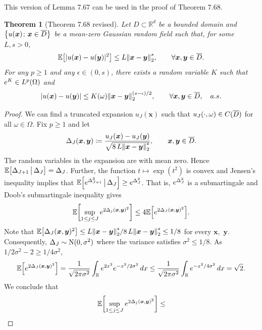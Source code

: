 \documentclass[final]{article}
\newtheorem*{theorem*}{Theorem}
\theoremstyle{definition}
\newcommand{\vecbs}[1]{\boldsymbol{#1}}
\renewcommand{\vec}[1]{{\vecbs{#1}}}
\begin{document}
\begin{enumerate}
\begin{description}
This version of Lemma 7.67 can be used in the proof of Theorem 7.68.


\begin{theorem*}[Theorem 7.68 revised]%
  \label{thm:gauss_reg}%
  Let $D\subset\mathbb{R}^d$ be a bounded  domain and $\Bp{u(\vec x)\colon \vec x\in
  {\Dbar}}$ be a mean-zero Gaussian random field such that, for
  some $L,s>0$,
  \begin{equation}\label{eq:gauss_reg}
    \mean{|u(\vec x)-u(\vec y)|^2}%
    \le L \enorm{\vec x-\vec y}^{s},\qquad \forall
    \vec x, \vec y\in{\Dbar}.
  \end{equation}
  For any $p\ge 1$ and any $\epsilon\in(0,s)$, there exists a random variable
  $K$ such that ${e}^K \in {L}^p(\Omega)$ and
  \begin{equation}\label{eq:hi}
    \abs{u(\vec x)- u(\vec y)}%
    \le K(\omega) \enorm{\vec x-\vec y}^{(s-\epsilon)/2},%
    \qquad \forall  \vec x,\vec y\in {\Dbar},\quad a.s.
  \end{equation}
\end{theorem*}
%
\begin{proof} We can find a truncated \KL expansion
  $u_J(\vec x)$  such that
  $u_J(\cdot,\omega)\in {C}({\overline{D}})$ for all $\omega\in
  \Omega$. Fix $p\ge 1$ and let
  \[
  \Delta_J(\vec x, \vec y)%
  \coloneq\frac{u_J(\vec x)-u_J(\vec y)}%
  {\tsqrt{8 \,L \enorm{\vec x-\vec y}^s}},\qquad
  \vec x,\vec y\in {\Dbar}.
  \]
  The random variables in the \KL expansion are \iid with mean
  zero. Hence $\mean{\Delta_{J+1}\,\big|\, \Delta_J}=\Delta_J$. Further,
  the function $t\mapsto\exp( t^2)$ is convex and Jensen's inequality
  implies that $\mean{ \erm^{\Delta_{J+1}^2}\,\big|\, \Delta_J} \ge
  \erm^{\Delta_J^2}$. That is, ${e}^{\Delta_J^2}$ is a submartingale and
  Doob's submartingale inequality  gives
  \[
  \mean{{\sup_{1 \le j\le J} \erm^{2
        \Delta_j(\vec x, \vec y)^2}}} %
  \le 4\mean{ \erm^{2 \Delta_J(\vec x, \vec y)^2}}.
  \]
  Note that $\mean{\Delta_J(\vec x,\vec y)^2} \le L \enorm{\vec
    x-\vec y}^s/8\,L \enorm{\vec x-\vec y}^{s}\le 1/8$ for every
  $\vec{x},$ $\vec{y}$. Consequently, $\Delta_J\sim
  \mathrm{N}(0,\sigma^2)$ where the variance satisfies $\sigma^2\le
  1/8$. As $1/2\sigma^2-2 \ge 1/4\sigma^2$,
  \[
  \mean{\erm^{2 \Delta_J(\vec x, \vec y)^2}}%
  =\frac{1}{\tsqrt{2\pi \sigma^2}} \int_\real \erm^{2 x^2}
  \erm^{-x^2/2\sigma^2}\,dx %
  \le \frac{1}{\tsqrt{2\pi \sigma^2}} \int_\real \erm^{-x^2/4\sigma^2}\,dx
  =\tsqrt{2}.
  \]
  We conclude that
  \[
  \mean{{\sup_{1 \le j\le J} \erm^{2 \Delta_j(\vec x, \vec y)^2}}} \le
\]
\end{proof}
\end{description}
\end{enumerate}
\end{document}
